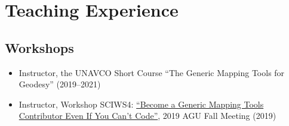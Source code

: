 \section{Teaching Experience}

\subsection{Workshops}
\begin{itemize}
\item Instructor, the UNAVCO Short Course ``The Generic Mapping Tools for Geodesy'' (2019--2021)
\item Instructor, Workshop SCIWS4: \href{https://www.agu.org/Events/SCIWS4-Generic-Mapping-Tools}{``Become a Generic Mapping Tools Contributor Even If You Can't Code''}, 2019 AGU Fall Meeting (2019)
\end{itemize}
